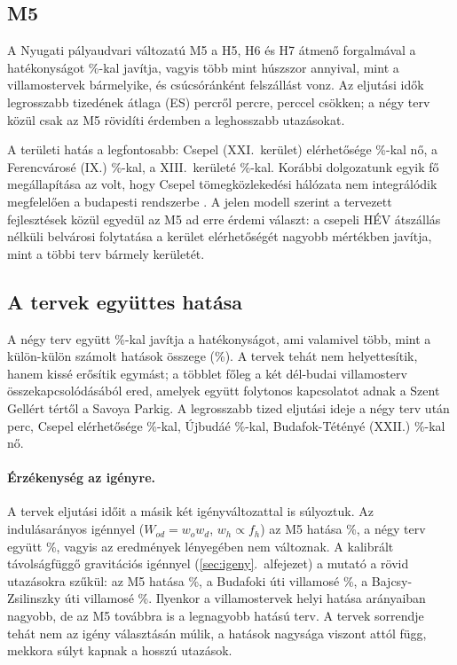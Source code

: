 \documentclass[12pt,a4paper]{article}
\theoremstyle{definition}
\theoremstyle{remark}
\begin{document}
\subsection{M5}

A Nyugati pályaudvari változatú M5 a H5, H6 és H7 átmenő forgalmával a
hatékonyságot \PLMFGAIN\%-kal javítja, vagyis több mint húszszor annyival,
mint a villamostervek bármelyike, és csúcsóránként \PLMFBOARD{} felszállást
vonz. Az eljutási idők legrosszabb tizedének átlaga (ES) \ESZERO{} percről
\PLMFES{} percre, \PLMFESDIFF{} perccel csökken; a négy terv közül csak az M5
rövidíti érdemben a leghosszabb utazásokat.

A területi hatás a legfontosabb: Csepel (XXI.~kerület) elérhetősége
\PLMFDXXI\%-kal nő, a Ferencvárosé (IX.) \PLMFDIX\%-kal, a XIII.~kerületé
\PLMFDXIII\%-kal. Korábbi dolgozatunk egyik fő megállapítása az volt, hogy
Csepel tömegközlekedési hálózata nem integrálódik megfelelően a budapesti
rendszerbe \citep{molnar2026}. A jelen modell szerint a tervezett fejlesztések
közül egyedül az M5 ad erre érdemi választ: a csepeli HÉV átszállás nélküli
belvárosi folytatása a kerület elérhetőségét nagyobb mértékben javítja, mint
a többi terv bármely kerületét.

\subsection{A tervek együttes hatása}

A négy terv együtt \PKGPLGAIN\%-kal javítja a hatékonyságot, ami valamivel
több, mint a külön-külön számolt hatások összege (\PKGPLSUM\%). A tervek
tehát nem helyettesítik, hanem kissé erősítik egymást; a többlet főleg a két
dél-budai villamosterv összekapcsolódásából ered, amelyek együtt folytonos
kapcsolatot adnak a Szent Gellért tértől a Savoya Parkig. A legrosszabb tized
eljutási ideje a négy terv után \PKGPLES{} perc, Csepel elérhetősége
\PKGDXXI\%-kal, Újbudáé \PKGDXI\%-kal, Budafok-Tétényé (XXII.)
\PKGDXXII\%-kal nő.

\paragraph{Érzékenység az igényre.}
A tervek eljutási időit a másik két igényváltozattal is súlyoztuk. Az
indulásarányos igénnyel ($W_{od}=w_ow_d$, $w_h\propto f_h$) az M5 hatása
\RBDEPMFGAIN\%, a négy terv együtt \RBDEPPKGGAIN\%, vagyis az eredmények
lényegében nem változnak. A kalibrált távolságfüggő gravitációs igénnyel
(\ref{sec:igeny}.~alfejezet) a mutató a rövid utazásokra szűkül: az M5
hatása \RBGRAVMFGAIN\%, a Budafoki úti villamosé \RBGRAVBUGAIN\%, a
Bajcsy-Zsilinszky úti villamosé \RBGRAVBAJGAIN\%. Ilyenkor a villamostervek
helyi hatása arányaiban nagyobb, de az M5 továbbra is a legnagyobb hatású
terv. A tervek sorrendje tehát nem az igény választásán múlik, a hatások
nagysága viszont attól függ, mekkora súlyt kapnak a hosszú utazások.
\end{document}
